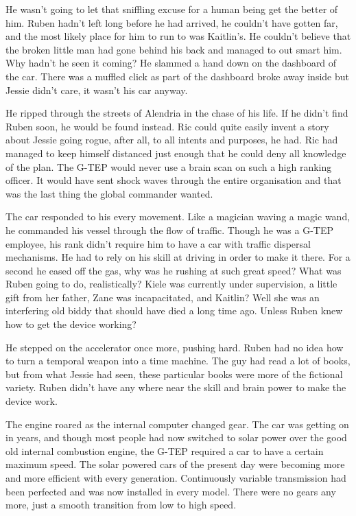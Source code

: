 \thoughtbreak



He wasn't going to let that sniffling excuse for a human being get the better of him.  Ruben hadn't left long before he had arrived, he couldn't have gotten far, and the most likely place for him to run to was Kaitlin's.  He couldn't believe that the broken little man had gone behind his back and managed to out smart him.  Why hadn't he seen it coming?  He slammed a hand down on the dashboard of the car.  There was a muffled click as part of the dashboard broke away inside but Jessie didn't care, it wasn't his car anyway.

He ripped through the streets of Alendria in the chase of his life.  If he didn't find Ruben soon, he would be found instead.  Ric could quite easily invent a story about Jessie going rogue, after all, to all intents and purposes, he had.  Ric had managed to keep himself distanced just enough that he could deny all knowledge of the plan.  The G-TEP would never use a brain scan on such a high ranking officer.  It would have sent shock waves through the entire organisation and that was the last thing the global commander wanted.

The car responded to his every movement.  Like a magician waving a magic wand, he commanded his vessel through the flow of traffic.  Though he was a G-TEP employee, his rank didn't require him to have a car with traffic dispersal mechanisms.  He had to rely on his skill at driving in order to make it there.  For a second he eased off the gas, why was he rushing at such great speed?  What was Ruben going to do, realistically?  Kiele was currently under supervision, a little gift from her father, Zane was incapacitated, and Kaitlin?  Well she was an interfering old biddy that should have died a long time ago.  Unless Ruben knew how to get the device working?

He stepped on the accelerator once more, pushing hard.  Ruben had no idea how to turn a temporal weapon into a time machine.  The guy had read a lot of books, but from what Jessie had seen, these particular books were more of the fictional variety.  Ruben didn't have any where near the skill and brain power to make the device work.

The engine roared as the internal computer changed gear.  The car was getting on in years, and though most people had now switched to solar power over the good old internal combustion engine, the G-TEP required a car to have a certain maximum speed.  The solar powered cars of the present day were becoming more and more efficient with every generation.  Continuously variable transmission had been perfected and was now installed in every model.  There were no gears any more, just a smooth transition from low to high speed.

